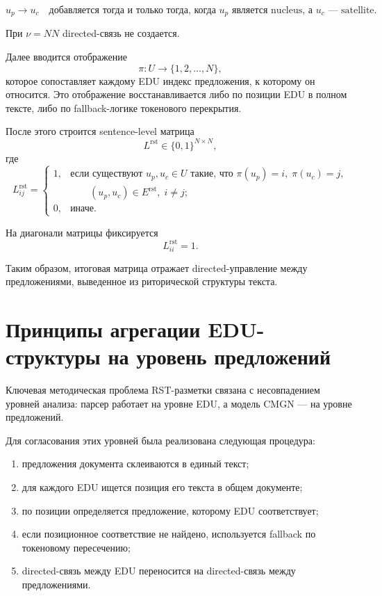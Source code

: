 \documentclass[12pt,a4paper]{article}
\begin{document}
\[
u_p \rightarrow u_c \quad \text{добавляется тогда и только тогда, когда } u_p
\text{ является nucleus, а } u_c \text{ --- satellite.}
\]

При $\nu = NN$ directed-связь не создается.

Далее вводится отображение
\[
\pi: U \rightarrow \{1,2,\dots,N\},
\]
которое сопоставляет каждому EDU индекс предложения, к которому он относится. Это
отображение восстанавливается либо по позиции EDU в полном тексте, либо по fallback-логике
токенового перекрытия.

После этого строится sentence-level матрица
\[
L^{\text{rst}} \in \{0,1\}^{N \times N},
\]
где
\[
L^{\text{rst}}_{ij} =
\begin{cases}
1, & \text{если существуют } u_p, u_c \in U \text{ такие, что } \pi(u_p)=i,\; \pi(u_c)=j,\\
   & \qquad (u_p,u_c)\in E^{\text{rst}},\; i \neq j;\\
0, & \text{иначе.}
\end{cases}
\]

На диагонали матрицы фиксируется
\[
L^{\text{rst}}_{ii}=1.
\]

Таким образом, итоговая матрица отражает directed-управление между предложениями,
выведенное из риторической структуры текста.

\section{Принципы агрегации EDU-структуры на уровень предложений}

Ключевая методическая проблема RST-разметки связана с несовпадением уровней анализа:
парсер работает на уровне EDU, а модель CMGN --- на уровне предложений.

Для согласования этих уровней была реализована следующая процедура:

\begin{enumerate}
    \item предложения документа склеиваются в единый текст;
    \item для каждого EDU ищется позиция его текста в общем документе;
    \item по позиции определяется предложение, которому EDU соответствует;
    \item если позиционное соответствие не найдено, используется fallback по токеновому
    пересечению;
    \item directed-связь между EDU переносится на directed-связь между предложениями.
\end{enumerate}
\end{document}
